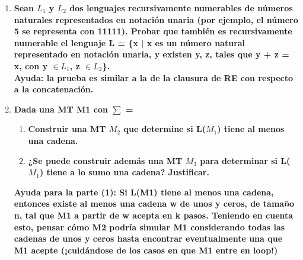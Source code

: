 \documentclass{article}
\begin{document}
\begin{enumerate}
\item \textbf{Sean $L_1$ y $L_2$ dos lenguajes recursivamente numerables de números naturales
representados en notación unaria (por ejemplo, el número 5 se representa con 11111). Probar
que también es recursivamente numerable el lenguaje L = \{x $\mid$ x es un número natural
representado en notación unaria, y existen y, z, tales que y + z = x, con y $\in L_1$, z $\in L_2$\}.\\}
\textbf{Ayuda: la prueba es similar a la de la clausura de RE con respecto a la concatenación. }
 
\item \textbf{ Dada una MT M1 con $\sum$ = }

\begin{enumerate}
\item \textbf{ Construir una MT $M_2$ que determine si L($M_1$) tiene al menos una cadena.}
\item \textbf{ ¿Se puede construir además una MT $M_3$ para determinar si L($M_1$) tiene a lo sumo una
cadena? Justificar.
}
\end{enumerate}

\textbf{Ayuda para la parte (1): Si L(M1) tiene al menos una cadena, entonces existe al menos una
cadena w de unos y ceros, de tamaño n, tal que M1 a partir de w acepta en k pasos. Teniendo
en cuenta esto, pensar cómo M2 podría simular M1 considerando todas las cadenas de unos y
ceros hasta encontrar eventualmente una que M1 acepte (¡cuidándose de los casos en que M1
entre en loop!)}

\end{enumerate}
\end{document}
